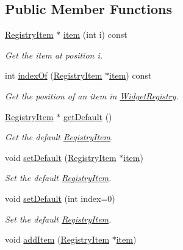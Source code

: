 \subsection*{Public Member Functions}
\begin{DoxyCompactItemize}
\item 
\hyperlink{class_registry_item}{Registry\+Item} $\ast$ \hyperlink{class_widget_registry_acc992d9f1f43b631bde87450b0c25b80}{item} (int i) const 
\begin{DoxyCompactList}\small\item\em Get the item at position i. \end{DoxyCompactList}\item 
int \hyperlink{class_widget_registry_ad387790fdf8774107a61a5678bb56749}{index\+Of} (\hyperlink{class_registry_item}{Registry\+Item} $\ast$\hyperlink{class_widget_registry_acc992d9f1f43b631bde87450b0c25b80}{item}) const 
\begin{DoxyCompactList}\small\item\em Get the position of an item in \hyperlink{class_widget_registry}{Widget\+Registry}. \end{DoxyCompactList}\item 
\hyperlink{class_registry_item}{Registry\+Item} $\ast$ \hyperlink{class_widget_registry_a0841639b77ada4dc770886fea9fef193}{get\+Default} ()
\begin{DoxyCompactList}\small\item\em Get the default \hyperlink{class_registry_item}{Registry\+Item}. \end{DoxyCompactList}\item 
void \hyperlink{class_widget_registry_aa77ed2504c7e241eabf49ff4e1088fa2}{set\+Default} (\hyperlink{class_registry_item}{Registry\+Item} $\ast$\hyperlink{class_widget_registry_acc992d9f1f43b631bde87450b0c25b80}{item})
\begin{DoxyCompactList}\small\item\em Set the default \hyperlink{class_registry_item}{Registry\+Item}. \end{DoxyCompactList}\item 
void \hyperlink{class_widget_registry_a3d0fa9207009556d5218a3dda73349d0}{set\+Default} (int index=0)
\begin{DoxyCompactList}\small\item\em Set the default \hyperlink{class_registry_item}{Registry\+Item}. \end{DoxyCompactList}\item 
void \hyperlink{class_widget_registry_a53de88d7a538a8a6bbbcca4328abb480}{add\+Item} (\hyperlink{class_registry_item}{Registry\+Item} $\ast$\hyperlink{class_widget_registry_acc992d9f1f43b631bde87450b0c25b80}{item})

\end{DoxyCompactItemize}
